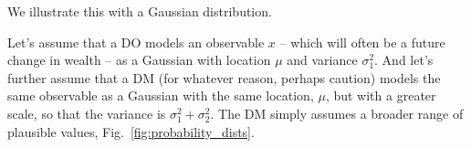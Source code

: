 \documentclass[%
	11pt,
	abstract=true,	
	bibliography=oldstyle					%
]{scrartcl}
\newcommand{\fref}[1]{Fig.~\ref{fig:#1}}
\newcommand{\ie}{\textit{i.e.}\xspace}
\newcommand{\ND}{\mathcal{N}} %
\numberwithin{equation}{section}
\begin{document}
We illustrate this with a Gaussian distribution.

%
%

%

Let's assume that a DO models an observable $x$ -- which will often be a future change in wealth -- as a Gaussian with location $\mu$ and variance $\sigma_1^2$. And let's further assume that a DM (for whatever reason, perhaps caution) models the same observable as a Gaussian with the same location, $\mu$, but with a greater scale, so that the variance is $\sigma_1^2+\sigma_2^2$. The DM simply assumes a broader range of plausible values, \fref{probability_dists}.
\end{document}
